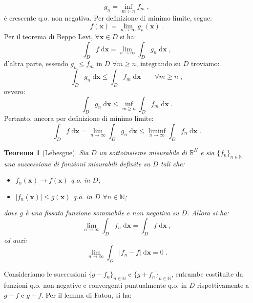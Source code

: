 \documentclass[a4paper,12pt]{report}
\theoremstyle{plain}
\newtheorem{thm}{Teorema}[section]
\theoremstyle{definition}
\theoremstyle{remark}
\newcommand{\diff}[1]{\mathrm{d}#1}
\numberwithin{equation}{section}
\begin{document}
\begin{equation}
g_n=\inf_{m>n} f_m\;,
\end{equation}
è crescente q.o. non negativa. Per definizione di minimo limite, segue:
\begin{equation}
f(\mathbf{x})=\lim_{n\to \infty}g_n(\mathbf{x})\;.
\end{equation}
Per il teorema di Beppo Levi, $\forall \mathbf{x}\in D$ si ha:
\begin{equation}
\int_D f\;\diff{\mathbf{x}}=\lim_{n\to\infty}\int_D g_n\;\diff{\mathbf{x}}\;,
\end{equation}
d'altra parte, essendo $g_n\le f_m$ in $D$ $\forall m\ge n$, integrando su $D$ troviamo:
\begin{equation}
\int_D g_n\;\diff{\mathbf{x}} \le \int_D f_m\;\diff{\mathbf{x}} \qquad \forall m\ge n\;,
\end{equation}
ovvero:
\begin{equation}
\int_D g_n\;\diff{\mathbf{x}} \le \inf_{m\ge n} \int_D f_m\;\diff{\mathbf{x}}\;.
\end{equation}
Pertanto, ancora per definizione di minimo limite:
\begin{equation}
\int_D f\;\diff{\mathbf{x}}=\lim_{n\to\infty}\int_D g_n\;\diff{\mathbf{x}}\le \liminf_{n\to\infty}\int_D f_n\;\diff{\mathbf{x}}\;.
\end{equation}
\endproof
\begin{thm}[Lebesgue] Sia $D$ un sottoinsieme misurabile di $\mathbb{R}^N$ e sia $\{f_n\}_{n\in\mathbb{N}}$ una successione di funzioni misurabili definite su $D$ tali che:
\begin{itemize}
 \item $f_n(\mathbf{x})\to f(\mathbf{x})$ q.o. in $D$;
 \item $|f_n(\mathbf{x})|\le g(\mathbf{x})$ q.o. in $D$ $\forall n \in \mathbb{N}$;
\end{itemize}
dove $g$ è una fissata funzione sommabile e non negativa su $D$. Allora si ha:
\begin{equation}
\lim_{n\to \infty}\int_D f_n\;\diff{\mathbf{x}}=\int_D f\;\diff{\mathbf{x}}\;,
\end{equation}
ed anzi:
\begin{equation}
\lim_{n\to \infty} \int_D|f_n-f|\;\diff{\mathbf{x}}=0\;.
\end{equation}
\end{thm}
\proof Consideriamo le successioni $\{g-f_n\}_{n\in\mathbb{N}}$ e $\{g+f_n\}_{n\in\mathbb{N}}$, entrambe costituite da funzioni q.o. non negative e convergenti puntualmente q.o. in $D$ rispettivamente a $g-f$ e $g+f$. Per il lemma di Fatou, si ha:
\end{document}

